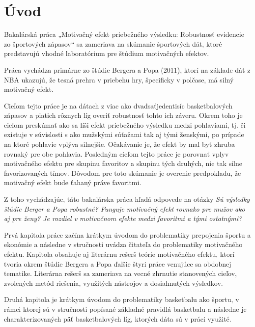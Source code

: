 \documentclass[
  digital, %
  oneside, %
  notable,   %
  lof,     %
  lot,     %
]{fithesis3}
\begin{document}
	\makeatletter
	\thesis@preamble %
	\makeatother
	
	\chapter*{Úvod}
	
	Bakalárská práca „Motivačný efekt priebežného výsledku: Robustnosť evidencie zo športových zápasov“ sa zameriava na skúmanie športových dát, ktoré predstavujú vhodné laboratórium pre štúdium motivačných efektov.
	
	Práca vychádza primárne zo štúdie Bergera a Popa (2011), ktorí na základe dát z NBA ukazujú, že tesná prehra v priebehu hry, špecificky v polčase, má silný motivačný efekt. 
	
	Cieľom tejto práce je na dátach z viac ako dvadsaťjedentisíc  basketbalových zápasov a piatich rôznych líg overiť robustnosť tohto ich záveru. Okrem toho je cieľom preskúmať ako sa líši efekt priebežného výsledku medzi pohlaviami, tj. či existuje v súvislosti s ako mužskými súťažami tak aj tými ženskými, po prípade na ktoré pohlavie vplýva silnejšie. Očakávanie je, že efekt by mal byť zhruba rovnaký pre obe pohlavia. Posledným cieľom tejto práce je porovnať vplyv motivačného efektu pre skupinu favoritov a skupinu tých druhých, nie tak silne favorizovaných tímov. Dôvodom pre toto skúmanie je overenie predpokladu, že motivačný efekt bude ťahaný práve favoritmi.
	
	Z toho vychádzajúc, táto bakalárska práca hľadá odpovede na otázky \textit{Sú výsledky štúdie Berger a Popa robustné? Funguje motivačný efekt rovnako pre mužov ako aj pre ženy? Je rozdiel v motivačnom efekte medzi favoritmi a tými ostatnými?} 
	
	Prvá kapitola práce začína krátkym úvodom do problematiky prepojenia športu a ekonómie a následne v stručnosti uvádza čitateľa do problematiky  motivačného efektu. Kapitola obsahuje aj literárnu rešerš teórie motivačného efektu, ktorí tvoria okrem štúdie Bergera a Popa ďalšie štyri práce venujúce sa obdobnej tematike. Literárna rešerš sa zameriava na vecné zhrnutie stanovených cieľov, zvolených metód riešenia, využitých nástrojov a dosiahnutých výsledkov. 
	
	Druhá kapitola je krátkym úvodom do problematiky basketbalu ako športu, v rámci ktorej sú v stručnosti popísané základné pravidlá basketbalu a následne je charakterizovaných päť basketbalových líg, ktorých dáta sú v práci využité.
	
\end{document}
